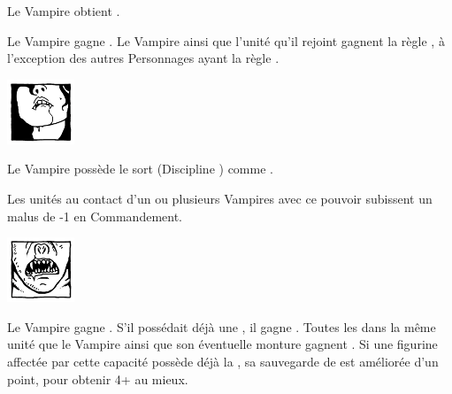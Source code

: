 \begin{multicols}{2}
\startpricelist

 Le Vampire obtient .

 Le Vampire gagne \awaken{\zombies, \direwolves, \batswarms, \greatbats}. Le Vampire ainsi que l'unité qu'il rejoint gagnent la règle \swiftstride{}, à l'exception des autres Personnages ayant la règle \vampiric{}.

\endpricelist

\begin{center}\includegraphics[width=2cm]{logos/logo_lamia.png}\end{center}
\vspace*{-1.2cm}

\startpricelist

 Le Vampire possède le sort \lustspellfour{} (Discipline \lust{}) comme .

 Les unités au contact d'un ou plusieurs Vampires avec ce pouvoir subissent un malus de -1 en Commandement.

\endpricelist

\columnbreak
\begin{center}\includegraphics[width=2cm]{logos/logo_strigoi.png}\end{center}
\vspace*{-1.2cm}

\startpricelist

 Le Vampire gagne . S'il possédait déjà une \regeneration{}, il gagne . Toutes les \ghouls{} dans la même unité que le Vampire ainsi que son éventuelle monture gagnent . Si une figurine affectée par cette capacité possède déjà la \regeneration{}, sa sauvegarde de \regeneration{} est améliorée d'un point, pour obtenir 4+ au mieux.


\end{multicols}
